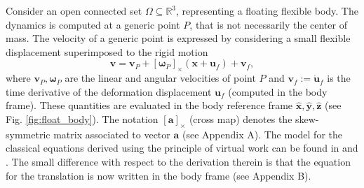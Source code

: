 \documentclass{svjour3}                     %
\newcommand{\crmat}[1]{\ensuremath{[#1]_{\times}}}
\begin{document}
Consider an open connected set $\Omega \subseteq \mathbb{R}^3$, representing a floating flexible body.  The dynamics is computed at a generic point $P$, that is not necessarily the center of mass. The velocity of a generic point is expressed by considering a small flexible displacement superimposed to the rigid motion
\[
\bm{v} = \bm{v}_P + \crmat{\bm{\omega}_P} (\bm{x}+\bm{u}_f) + \bm{v}_f,
\]
where $\bm{v}_P, \bm{\omega}_P$ are the linear and angular velocities of point $P$  and $\bm{v}_f := \dot{\bm{u}}_f$ is the time derivative of the deformation displacement $\bm{u}_f$ (computed in the body frame). These quantities are evaluated in the body reference frame $\widehat{\bm{x}}, \widehat{\bm{y}}, \widehat{\bm{z}}$ (see Fig. \ref{fig:float_body}). The notation $\crmat{\bm{a}}$ (cross map) denotes the skew-symmetric matrix associated to vector $\bm{a}$ (see Appendix A). The model for the classical equations derived using the principle of virtual work can be found in \cite{MB_Daepde} and \cite[Chapter 4]{simeon2013computational}. The small difference with respect to the derivation therein is that the equation for the translation is now written in the body frame (see Appendix B). 
\end{document}
